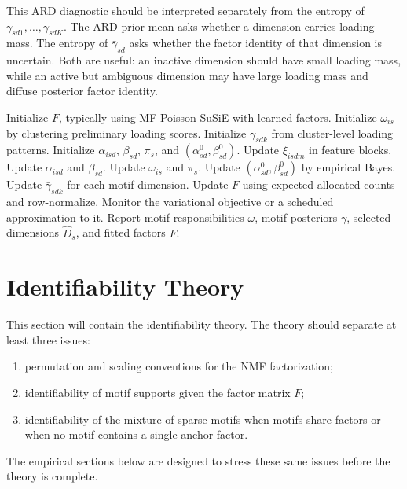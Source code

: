 \documentclass[11pt]{article}
\theoremstyle{definition}
\begin{document}
This ARD diagnostic should be interpreted separately from the entropy of
$\bar{\gamma}_{sd1},\ldots,\bar{\gamma}_{sdK}$. The ARD prior mean asks whether
a dimension carries loading mass. The entropy of $\bar{\gamma}_{sd}$ asks whether
the factor identity of that dimension is uncertain. Both are useful: an
inactive dimension should have small loading mass, while an active but
ambiguous dimension may have large loading mass and diffuse posterior factor
identity.

\begin{algorithm}[t]
\caption{MoS-NMF variational empirical-Bayes fitting}
\small
\begin{algorithmic}[1]
\State Initialize $F$, typically using MF-Poisson-SuSiE with learned factors.
\State Initialize $\omega_{is}$ by clustering preliminary loading scores.
\State Initialize $\bar{\gamma}_{sdk}$ from cluster-level loading patterns.
\State Initialize $\alpha_{isd}$, $\beta_{sd}$, $\pi_s$, and
$(\alpha_{sd}^0,\beta_{sd}^0)$.
  \State Update $\xi_{isdm}$ in feature blocks.
  \State Update $\alpha_{isd}$ and $\beta_{sd}$.
  \State Update $\omega_{is}$ and $\pi_s$.
  \State Update $(\alpha_{sd}^0,\beta_{sd}^0)$ by empirical Bayes.
  \State Update $\bar{\gamma}_{sdk}$ for each motif dimension.
    \State Update $F$ using expected allocated counts and row-normalize.
  \EndIf
  \State Monitor the variational objective or a scheduled approximation to it.
\EndFor
\State Report motif responsibilities $\omega$, motif posteriors
$\bar{\gamma}$, selected dimensions $\widehat{D}_s$, and fitted factors $F$.
\end{algorithmic}
\end{algorithm}

\section{Identifiability Theory}
\label{sec:identifiability}

This section will contain the identifiability theory. The theory should
separate at least three issues:
\begin{enumerate}
  \item permutation and scaling conventions for the NMF factorization;
  \item identifiability of motif supports given the factor matrix $F$;
  \item identifiability of the mixture of sparse motifs when motifs share
  factors or when no motif contains a single anchor factor.
\end{enumerate}
The empirical sections below are designed to stress these same issues before
the theory is complete.
\end{document}
